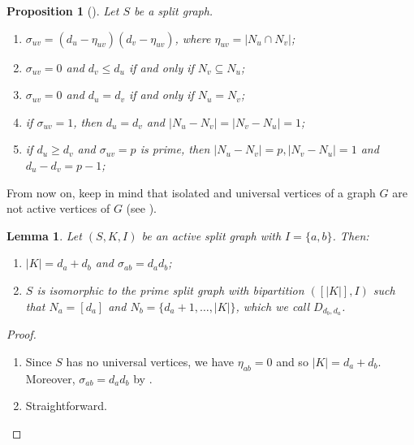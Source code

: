 \documentclass[11pt]{article}
\newtheorem{lemma}[lemma]{Lemma}
\newtheorem{proposition}[proposition]{Proposition}
\begin{document}
\begin{proposition}[\cite{pastine2025simple}]
	\label{prop.basicas.sigma_uv}
	Let $S$ be a split graph.
	\begin{enumerate}
		\item $\sigma_{uv}=(d_u-\eta_{uv})(d_v-\eta_{uv})$, where $\eta_{uv}=|N_u\cap N_v|$;
		
		\item $\sigma_{uv}=0$ and $d_v \leq d_u$ if and only if $N_v \subseteq N_u$; 
		
		\item $\sigma_{uv}=0$ and $d_u =d_v$ if and only if $N_u = N_v$;
		
		
		\item if $\sigma_{uv}=1$, then $d_u =d_v$ and $|N_u -N_v |=|N_v -N_u |=1$;
		
		\item if $d_u \geq d_v$ and $\sigma_{uv}=p$ is prime, then $|N_u -N_v |=p, |N_v -N_u |=1$ and $d_u-d_v=p-1$;
		
		
	\end{enumerate}
\end{proposition}

From now on, keep in mind that isolated and universal vertices of a graph $G$ are not active vertices of $G$ (see \cite{pastine20252}).

\begin{lemma}
	\label{S_activo_|I|=2}
	Let $(S,K,I)$ be an active split graph with $I=\{a,b\}$. Then: 
	\begin{enumerate}
		\item $|K|=d_a+d_b$ and $\sigma_{ab}=d_ad_b$;
		
		\item $S$ is isomorphic to the prime split graph with bipartition $([|K|],I)$ such that $N_a=[d_a]$ and $N_b=\{d_a+1,\ldots,|K|\}$, which we call $D_{d_b,d_a}$.
	\end{enumerate}
\end{lemma}

\begin{proof}
	\begin{enumerate}
		\item Since $S$ has no universal vertices, we have $\eta_{ab}=0$ and so $|K|=d_a+d_b$. Moreover, $\sigma_{ab}=d_ad_b$ by .
		
		\item Straightforward. \qedhere
	\end{enumerate}
\end{proof}
\end{document}
